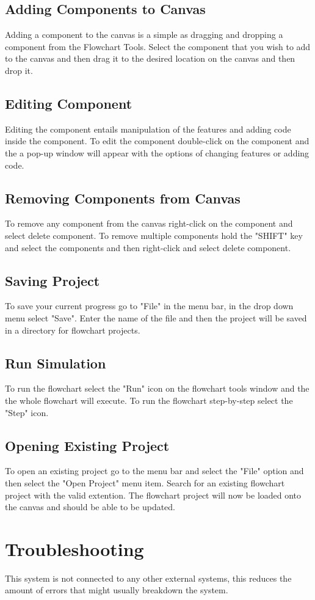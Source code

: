 \documentclass[11pt,a4paper,titlepage]{article}
\begin{document}
		
	\subsection{Adding Components to Canvas}
	
	Adding a component to the canvas is a simple as dragging and dropping a component from the Flowchart Tools. Select the component that you wish to add to the canvas and then drag it to the desired location on the canvas and then drop it.
	
	\subsection{Editing Component}
	
	Editing the component entails manipulation of the features and adding code inside the component. To edit the component double-click on the component and the a pop-up window will appear with the options of changing features or adding code.
		
	\subsection{Removing Components from Canvas}
	
	To remove any component from the canvas right-click on the component and select delete component. To remove multiple components hold the "SHIFT" key and select the components and then right-click and select delete component.
		
	\subsection{Saving Project}
	
	To save your current progress go to "File" in the menu bar, in the drop down menu select "Save". Enter the name of the file and then the project will be saved in a directory for flowchart projects.
	
	\subsection{Run Simulation}
	To run the flowchart select the "Run" icon on the flowchart tools window and the the whole flowchart will execute. To run the flowchart step-by-step select the "Step" icon.
	
		
	\subsection{Opening Existing Project}
	
	To open an existing project go to the menu bar and select the "File" option and then select the "Open Project" menu item. Search for an existing flowchart project with the valid extention. The flowchart project will now be loaded onto the canvas and should be able to be updated.
	
\section{Troubleshooting}

This system is not connected to any other external systems, this reduces the amount of errors that might usually breakdown the system.
\end{document}

